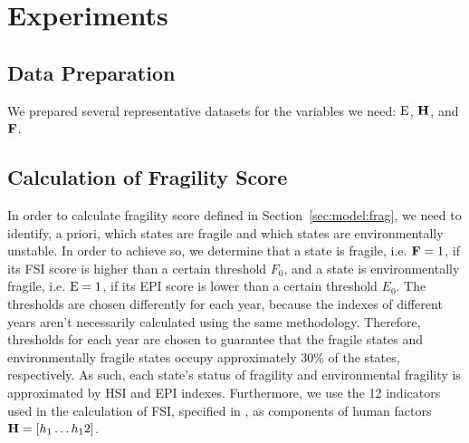 \section{Experiments}
\label{sec:exp}
\subsection{Data Preparation}
\label{sec:exp:prep}


We prepared several representative datasets for the variables we need: $\operatorname*{E}$, $\operatorname*{\mathbf{H}}$, and $\operatorname*{\mathbf{F}}$.



\subsection{Calculation of Fragility Score}
\label{sec:exp:frag}
In order to calculate fragility score defined in Section~\ref{sec:model:frag}, we need to identify, a priori, which states are fragile and which states are environmentally unstable. 
In order to achieve so, we determine that a state is fragile, i.e. $\operatorname*{\mathbf{F}}=1$, if its FSI score is higher than a certain threshold $F_0$, and a state is environmentally fragile, i.e. $\operatorname*{E}=1$, if its EPI score is lower than a certain threshold $E_0$. 
The thresholds are chosen differently for each year, because the indexes of different years aren't necessarily calculated using the same methodology.
Therefore, thresholds for each year are chosen to guarantee that the fragile states and environmentally fragile states occupy approximately $30\%$ of the states, respectively. As such, each state's status of fragility and environmental fragility is approximated by HSI and EPI indexes. Furthermore, we use the 12 indicators used in the calculation of FSI, specified in , as components of human factors $\operatorname*{\mathbf{H}} = \left[ h_1\ldots h_12 \right]$.

